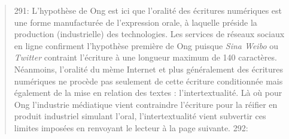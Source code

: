 \begin{quote}
291: L{\textquoteright}hypoth\`ese de Ong est ici que l{\textquoteright}oralit\'e des \'ecritures num\'eriques est une forme manufactur\'ee de l{\textquoteright}expression orale, \`a laquelle pr\'eside la production (industrielle) des technologies. Les services de r\'eseaux sociaux en ligne confirment l{\textquoteright}hypoth\`ese premi\`ere de Ong puisque \textit{Sina Weibo }ou \textit{Twitter }contraint l{\textquoteright}\'ecriture \`a une longueur maximum de 140 caract\`eres. N\'eanmoins, l{\textquoteright}oralit\'e du m\`eme Internet et plus g\'en\'eralement des \'ecritures num\'eriques ne proc\`ede pas seulement de cette \'ecriture conditionn\'ee mais \'egalement de la mise en relation des textes : l{\textquoteright}intertextualit\'e. L\`a o\`u pour Ong l{\textquoteright}industrie m\'ediatique vient contraindre l{\textquoteright}\'ecriture pour la r\'eifier en produit industriel simulant l{\textquoteright}oral, l{\textquoteright}intertextualit\'e vient subvertir ces limites impos\'ees en renvoyant le lecteur \`a la page suivante.  
292: 

\end{quote}
